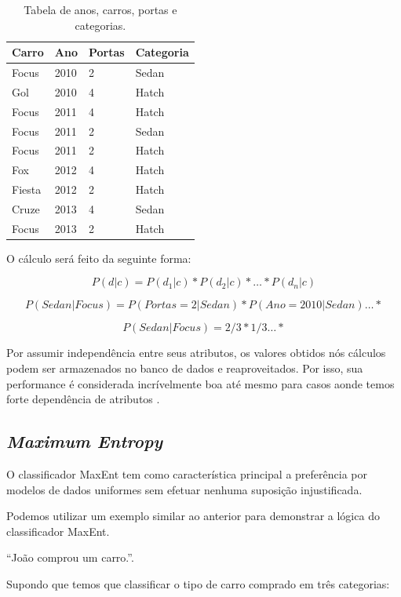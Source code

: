 \begin{table}[htb]
\centering
\begin{tabular}{|l|l|l|l|}
\hline
Carro  & Ano  & Portas & Categoria \\ \hline
Focus  & 2010 & 2      & Sedan     \\ \hline
Gol    & 2010 & 4      & Hatch     \\ \hline
Focus  & 2011 & 4      & Hatch     \\ \hline
Focus  & 2011 & 2      & Sedan     \\ \hline
Focus  & 2011 & 2      & Hatch     \\ \hline
Fox    & 2012 & 4      & Hatch     \\ \hline
Fiesta & 2012 & 2      & Hatch     \\ \hline
Cruze  & 2013 & 4      & Sedan     \\ \hline
Focus  & 2013 & 2      & Hatch     \\ \hline
\end{tabular}
\caption{Tabela de anos, carros, portas e categorias.}
\label{my-label}
\end{table}

O cálculo será feito da seguinte forma:

\[ P(d|c) = P(d_1|c) * P(d_2|c)* \ldots * P(d_n|c) \]

\[ P(Sedan|Focus) = P(Portas=2|Sedan) * P(Ano=2010|Sedan) \ldots * \]

\[ P(Sedan|Focus) = 2/3 * 1/3 \ldots * \]

Por assumir independência entre seus atributos, os valores obtidos nós cálculos
podem ser armazenados no banco de dados e reaproveitados. Por isso, sua
performance é considerada incrívelmente boa até mesmo para casos aonde temos forte dependência de
atributos \cite{domingos97naivebayes}.

\subsection{\textit{Maximum Entropy}}
O classificador \ac{MaxEnt} tem como
característica principal a preferência por modelos de dados uniformes sem efetuar nenhuma suposição injustificada.

Podemos utilizar um exemplo similar ao anterior para demonstrar a lógica do
classificador \ac{MaxEnt}. 
 
``João comprou um carro.''.

Supondo que temos que classificar o tipo de carro comprado em três categorias:

